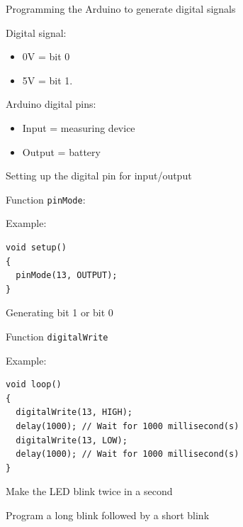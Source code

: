 \documentclass[aspectratio=1610]{beamer}
\begin{document}
\begin{frame}[plain,t]{Programming the Arduino to generate digital signals}

  \medskip
  Digital signal:
  \parbox[t]{3cm}{
    \begin{itemize}
      \item 0V = bit 0
      \item 5V = bit 1.
  \end{itemize}}

  \medskip
  Arduino digital pins:
  \parbox[t]{6cm}{
    \begin{itemize}
      \item Input = measuring device
      \item Output = battery
  \end{itemize}}
  
\end{frame}



\begin{frame}{Setting up the digital pin for input/output}

Function \texttt{pinMode}:

\bigskip
Example:
\begin{semiverbatim}
\begin{lstlisting}
void setup()
{
  pinMode(13, OUTPUT);
}
\end{lstlisting}
\end{semiverbatim}
\end{frame}




\begin{frame}{Generating bit 1 or bit 0}

  Function \texttt{digitalWrite}

\bigskip
Example:
\begin{semiverbatim}
\begin{lstlisting}  
void loop()
{
  digitalWrite(13, HIGH);
  delay(1000); // Wait for 1000 millisecond(s)
  digitalWrite(13, LOW);
  delay(1000); // Wait for 1000 millisecond(s)
}
\end{lstlisting}
\end{semiverbatim}
\end{frame}



\begin{frame}[plain,t]{Make the LED blink twice in a second}

\end{frame}



\begin{frame}[plain,t]{Program a long blink followed by a short blink}


\end{frame}

\end{document}
